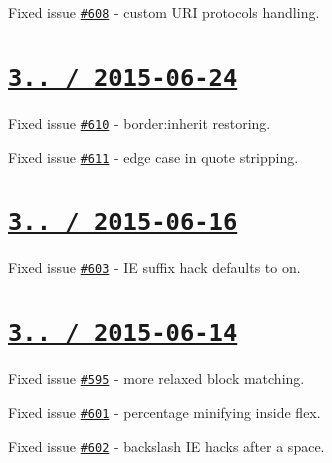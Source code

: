 \begin{DoxyItemize}
\item Fixed issue \href{https://github.com/jakubpawlowicz/clean-css/issues/608}{\tt \#608} -\/ custom U\+RI protocols handling.
\end{DoxyItemize}

\section*{\href{https://github.com/jakubpawlowicz/clean-css/compare/v3.3.3...v3.3.4}{\tt 3.. / 2015-\/06-\/24} }


\begin{DoxyItemize}
\item Fixed issue \href{https://github.com/jakubpawlowicz/clean-css/issues/610}{\tt \#610} -\/ {\ttfamily border\+:inherit} restoring.
\item Fixed issue \href{https://github.com/jakubpawlowicz/clean-css/issues/611}{\tt \#611} -\/ edge case in quote stripping.
\end{DoxyItemize}

\section*{\href{https://github.com/jakubpawlowicz/clean-css/compare/v3.3.2...v3.3.3}{\tt 3.. / 2015-\/06-\/16} }


\begin{DoxyItemize}
\item Fixed issue \href{https://github.com/jakubpawlowicz/clean-css/issues/603}{\tt \#603} -\/ IE suffix hack defaults to on.
\end{DoxyItemize}

\section*{\href{https://github.com/jakubpawlowicz/clean-css/compare/v3.3.1...v3.3.2}{\tt 3.. / 2015-\/06-\/14} }


\begin{DoxyItemize}
\item Fixed issue \href{https://github.com/jakubpawlowicz/clean-css/issues/595}{\tt \#595} -\/ more relaxed block matching.
\item Fixed issue \href{https://github.com/jakubpawlowicz/clean-css/issues/601}{\tt \#601} -\/ percentage minifying inside {\ttfamily flex}.
\item Fixed issue \href{https://github.com/jakubpawlowicz/clean-css/issues/602}{\tt \#602} -\/ backslash IE hacks after a space.
\end{DoxyItemize}

